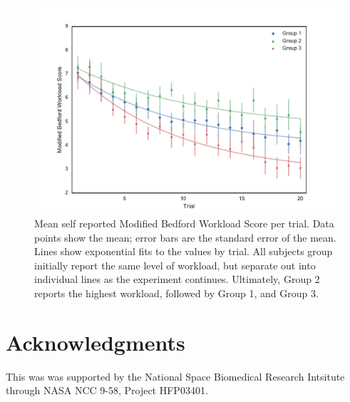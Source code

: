 \documentclass[]{aiaa-tc}%
\begin{document}
\begin{figure}[b!]
  \centering
  \includegraphics[width=0.8\linewidth]{figs/Group_workload_fit_30.pdf}
  \caption{Mean self reported Modified Bedford Workload Score per trial. Data points show the mean; error bars are the standard error of the mean. Lines show exponential fits to the values by trial. All subjects group initially report the same level of workload, but separate out into individual lines as the experiment continues. Ultimately, Group 2 reports the highest workload, followed by Group 1, and Group 3.}
  \label{fig:workload}
\end{figure}

\section*{Acknowledgments}
This was was supported by the National Space Biomedical Research Intsitute through NASA NCC 9-58, Project HFP03401.



\end{document}
